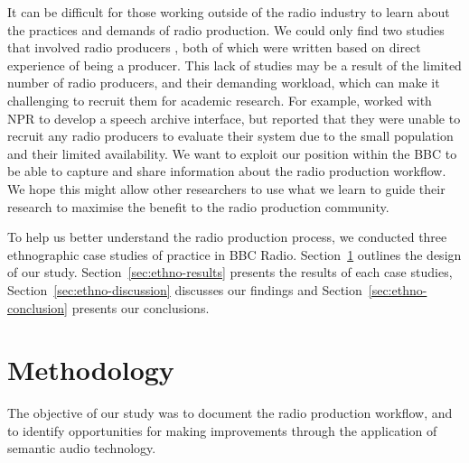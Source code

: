 
It can be difficult for those working outside of the radio industry to learn about the practices and demands of radio
production.  We could only find two studies that involved radio producers \citep{Dunaway2000,Barbour2004}, both of
which were written based on direct experience of being a producer. This lack of studies may be a result of the limited
number of radio producers, and their demanding workload, which can make it challenging to recruit them for academic
research. For example, \citet{Kim2003} worked with NPR to develop a speech archive interface, but reported that they
were unable to recruit any radio producers to evaluate their system due to the small population and their limited
availability.  We want to exploit our position within the BBC to be able to capture and share information about the
radio production workflow. We hope this might allow other researchers to use what we learn to guide their research to
maximise the benefit to the radio production community.


To help us better understand the radio production process, we conducted three ethnographic case studies of practice in
BBC Radio.
Section~\ref{sec:ethno-method} outlines the design of our study.
Section~\ref{sec:ethno-results} presents the results of each case studies,
Section~\ref{sec:ethno-discussion} discusses our findings and 
Section~\ref{sec:ethno-conclusion} presents our conclusions.

\section{Methodology}\label{sec:ethno-method}


The objective of our study was to document the radio production workflow, and to identify opportunities for making
improvements through the application of semantic audio technology.

